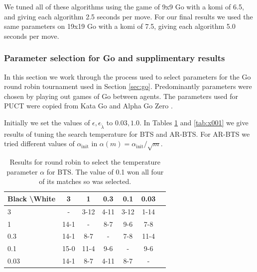 \documentclass{article}
\theoremstyle{plain}
\begin{document}
\begin{appendices}
    		We tuned all of these algorithms using the game of 9x9 Go with a komi of 6.5, and giving each algorithm 2.5 seconds per move. For our final results we used the same parameters on 19x19 Go with a komi of 7.5, giving each algorithm 5.0 seconds per move.

        




        \subsubsection{Parameter selection for Go and supplimentary results} \label{app:go_hps}

            In this section we work through the process used to select parameters for the Go round robin tournament used in Section \ref{sec:go}. Predominantly parameters were chosen by playing out games of Go between agents. The parameters used for PUCT were copied from Kata Go and Alpha Go Zero . 
            
            Initially we set the values of $\epsilon,\epsilon_{\tilde{\lambda}}$ to $0.03,1.0$. In Tables \ref{tab:w001} and \ref{tab:x001} we give results of tuning the search temperature for BTS and AR-BTS. For AR-BTS we tried different values of $\alpha_{\text{init}}$ in $\alpha(m)=\alpha_{\text{init}}/\sqrt{m}$.
            
            \begin{table}[]
            \centering
                \begin{tabular}{l|cccccc}
                    \textbf{Black \textbackslash White}     & 3  & 1   & 0.3   & 0.1    & 0.03    \\ 
                    \hline
                                            3            & -     & 3-12  & 4-11  & 3-12  & 1-14  \\
                                            1             & 14-1  & -     & 8-7  & 9-6  & 7-8  \\
                                            0.3             & 14-1   & 8-7   &   -   & 7-8  & 11-4  \\
                                            0.1              & 15-0  & 11-4  & 9-6  & -     & 9-6  \\
                                            0.03              & 14-1  & 8-7  & 4-11  & 8-7  &   -   \\    
                \end{tabular}
                \caption{Results for round robin to select the temperature parameter $\alpha$ for BTS. The value of 0.1 won all four of its matches so was selected. \label{tab:w001}}
            \end{table}
            

\end{appendices}
\end{document}
